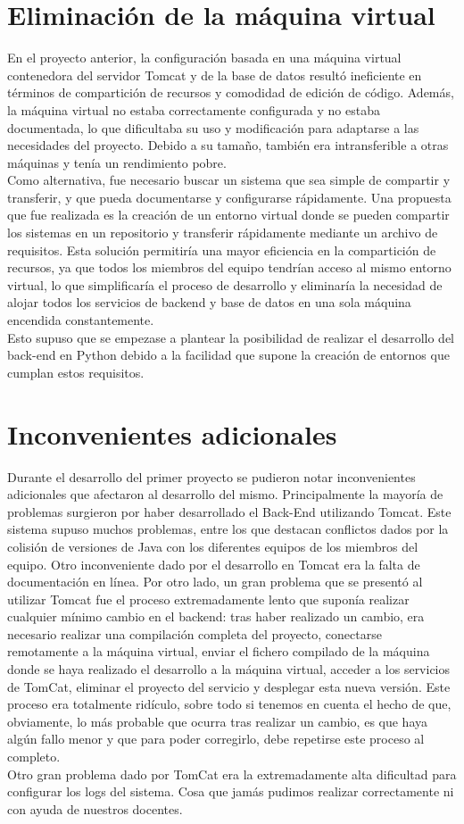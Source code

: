 \documentclass[12pt]{report}
\begin{document}
\section{Eliminación de la máquina virtual} 
En el proyecto anterior, la configuración basada en una máquina virtual contenedora del servidor Tomcat y de la base de datos resultó ineficiente en términos de compartición de recursos y comodidad de edición de código. Además, la máquina virtual no estaba correctamente configurada y no estaba documentada, lo que dificultaba su uso y modificación para adaptarse a las necesidades del proyecto. Debido a su tamaño, también era intransferible a otras máquinas y tenía un rendimiento pobre.\\
Como alternativa, fue necesario buscar un sistema que sea simple de compartir y transferir, y que pueda documentarse y configurarse rápidamente. Una propuesta que fue realizada es la creación de un entorno virtual donde se pueden compartir los sistemas en un repositorio y transferir rápidamente mediante un archivo de requisitos. Esta solución permitiría una mayor eficiencia en la compartición de recursos, ya que todos los miembros del equipo tendrían acceso al mismo entorno virtual, lo que simplificaría el proceso de desarrollo y eliminaría la necesidad de alojar todos los servicios de backend y base de datos en una sola máquina encendida constantemente.\\
Esto supuso que se empezase a plantear la posibilidad de realizar el desarrollo del back-end en Python debido a la facilidad que supone la creación de entornos que cumplan estos requisitos.
\section{Inconvenientes adicionales} 
Durante el desarrollo del primer proyecto se pudieron notar inconvenientes adicionales que afectaron al desarrollo del mismo.
Principalmente la mayoría de problemas surgieron por haber desarrollado el Back-End utilizando Tomcat.
Este sistema supuso muchos problemas, entre los que destacan conflictos dados por la colisión de versiones de Java con los diferentes equipos de los miembros del equipo.
Otro inconveniente dado por el desarrollo en Tomcat era la falta de documentación en línea.
Por otro lado, un gran problema que se presentó al utilizar Tomcat fue el proceso extremadamente lento que suponía realizar cualquier mínimo cambio en el backend: tras haber realizado un cambio, era necesario realizar una compilación completa del proyecto, conectarse remotamente a la máquina virtual, enviar el fichero compilado de la máquina donde se haya realizado el desarrollo a la máquina virtual, acceder a los servicios de TomCat, eliminar el proyecto del servicio y desplegar esta nueva versión. Este proceso era totalmente ridículo, sobre todo si tenemos en cuenta el hecho de que, obviamente, lo más probable que ocurra tras realizar un cambio, es que haya algún fallo menor y que para poder corregirlo, debe repetirse este proceso al completo.\\
Otro gran problema dado por TomCat era la extremadamente alta dificultad para configurar los logs del sistema. Cosa que jamás pudimos realizar correctamente ni con ayuda de nuestros docentes.
\end{document}
